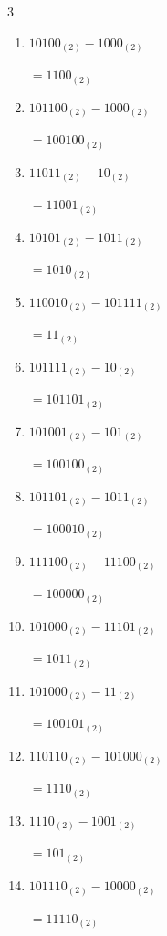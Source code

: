 \begin{multicols}{3}
\begin{enumerate}
  \item $10100_{(2)} - 1000_{(2)}$

        $=1100_{(2)}$

  \item $101100_{(2)} - 1000_{(2)}$

        $=100100_{(2)}$

  \item $11011_{(2)} - 10_{(2)}$

        $=11001_{(2)}$

  \item $10101_{(2)} - 1011_{(2)}$

        $=1010_{(2)}$

  \item $110010_{(2)} - 101111_{(2)}$

        $=11_{(2)}$

  \item $101111_{(2)} - 10_{(2)}$

        $=101101_{(2)}$

\columnbreak %

\resetques

  \item $101001_{(2)} - 101_{(2)}$

        $=100100_{(2)}$

  \item $101101_{(2)} - 1011_{(2)}$

        $=100010_{(2)}$

  \item $111100_{(2)} - 11100_{(2)}$

        $=100000_{(2)}$

  \item $101000_{(2)} - 11101_{(2)}$

        $=1011_{(2)}$

  \item $101000_{(2)} - 11_{(2)}$

        $=100101_{(2)}$

  \item $110110_{(2)} - 101000_{(2)}$

        $=1110_{(2)}$

  \item $1110_{(2)} - 1001_{(2)}$

        $=101_{(2)}$

  \item $101110_{(2)} - 10000_{(2)}$

        $=11110_{(2)}$


\end{enumerate}
\end{multicols}
